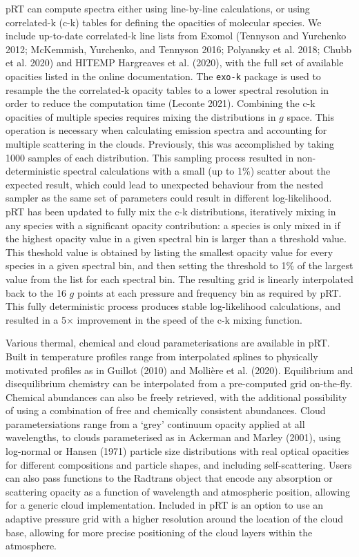 \documentclass[10pt,a4paper,onecolumn]{article}
\begin{document}
pRT can compute spectra either using line-by-line calculations, or using
correlated-k (c-k) tables for defining the opacities of molecular
species. We include up-to-date correlated-k line lists from Exomol
(Tennyson and Yurchenko 2012; McKemmish, Yurchenko, and Tennyson 2016;
Polyansky et al. 2018; Chubb et al. 2020) and HITEMP Hargreaves et al.
(2020), with the full set of available opacities listed in the online
documentation. The \verb|exo-k| package is used to resample the the
correlated-k opacity tables to a lower spectral resolution in order to
reduce the computation time (Leconte 2021). Combining the c-k opacities
of multiple species requires mixing the distributions in \(g\) space.
This operation is necessary when calculating emission spectra and
accounting for multiple scattering in the clouds. Previously, this was
accomplished by taking 1000 samples of each distribution. This sampling
process resulted in non-deterministic spectral calculations with a small
(up to 1\%) scatter about the expected result, which could lead to
unexpected behaviour from the nested sampler as the same set of
parameters could result in different log-likelihood. pRT has been
updated to fully mix the c-k distributions, iteratively mixing in any
species with a significant opacity contribution: a species is only mixed
in if the highest opacity value in a given spectral bin is larger than a
threshold value. This theshold value is obtained by listing the smallest
opacity value for every species in a given spectral bin, and then
setting the threshold to 1\% of the largest value from the list for each
spectral bin. The resulting grid is linearly interpolated back to the 16
\(g\) points at each pressure and frequency bin as required by pRT. This
fully deterministic process produces stable log-likelihood calculations,
and resulted in a 5\(\times\) improvement in the speed of the c-k mixing
function.

Various thermal, chemical and cloud parameterisations are available in
pRT. Built in temperature profiles range from interpolated splines to
physically motivated profiles as in Guillot (2010) and Mollière et al.
(2020). Equilibrium and disequilibrium chemistry can be interpolated
from a pre-computed grid on-the-fly. Chemical abundances can also be
freely retrieved, with the additional possibility of using a combination
of free and chemically consistent abundances. Cloud parametersiations
range from a `grey' continuum opacity applied at all wavelengths, to
clouds parameterised as in Ackerman and Marley (2001), using log-normal
or Hansen (1971) particle size distributions with real optical opacities
for different compositions and particle shapes, and including
self-scattering. Users can also pass functions to the Radtrans object
that encode any absorption or scattering opacity as a function of
wavelength and atmospheric position, allowing for a generic cloud
implementation. Included in pRT is an option to use an adaptive pressure
grid with a higher resolution around the location of the cloud base,
allowing for more precise positioning of the cloud layers within the
atmosphere.
\end{document}

